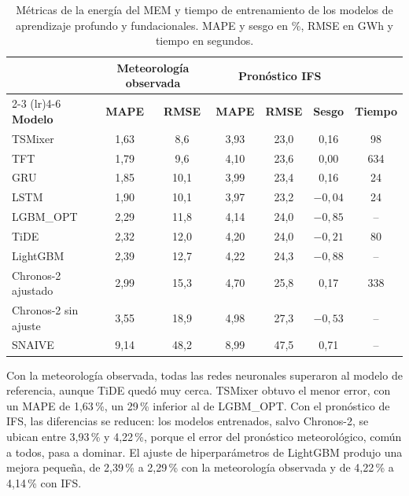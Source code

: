 \begin{table}[H]
	\centering
	\caption{Métricas de la energía del MEM y tiempo de entrenamiento de los modelos de aprendizaje profundo y fundacionales. MAPE y sesgo en \%, RMSE en GWh y tiempo en segundos.}
	\label{tab:resultados_profundos}
	\small
	\setlength{\tabcolsep}{4pt}
	\renewcommand{\arraystretch}{1.15}
	\begin{tabular*}{\textwidth}{@{\extracolsep{\fill}}lcccccc@{}}
		\toprule
		& \multicolumn{2}{c}{\textbf{Meteorología observada}} & \multicolumn{3}{c}{\textbf{Pronóstico IFS}} & \\
		\cmidrule(lr){2-3} \cmidrule(lr){4-6}
		\textbf{Modelo} & \textbf{MAPE} & \textbf{RMSE} & \textbf{MAPE} & \textbf{RMSE} & \textbf{Sesgo} & \textbf{Tiempo} \\
		\midrule
		TSMixer & 1,63 & 8,6 & 3,93 & 23,0 & 0,16 & 98 \\ \addlinespace[2pt]
		TFT & 1,79 & 9,6 & 4,10 & 23,6 & 0,00 & 634 \\ \addlinespace[2pt]
		GRU & 1,85 & 10,1 & 3,99 & 23,4 & 0,16 & 24 \\ \addlinespace[2pt]
		LSTM & 1,90 & 10,1 & 3,97 & 23,2 & $-0{,}04$ & 24 \\ \addlinespace[2pt]
		LGBM\_OPT & 2,29 & 11,8 & 4,14 & 24,0 & $-0{,}85$ & -- \\ \addlinespace[2pt]
		TiDE & 2,32 & 12,0 & 4,20 & 24,0 & $-0{,}21$ & 80 \\ \addlinespace[2pt]
		LightGBM & 2,39 & 12,7 & 4,22 & 24,3 & $-0{,}88$ & -- \\ \addlinespace[2pt]
		Chronos-2 ajustado & 2,99 & 15,3 & 4,70 & 25,8 & 0,17 & 338 \\ \addlinespace[2pt]
		Chronos-2 sin ajuste & 3,55 & 18,9 & 4,98 & 27,3 & $-0{,}53$ & -- \\ \addlinespace[2pt]
		SNAIVE & 9,14 & 48,2 & 8,99 & 47,5 & 0,71 & -- \\
		\bottomrule
	\end{tabular*}
\end{table}

Con la meteorología observada, todas las redes neuronales superaron al modelo de referencia, aunque TiDE quedó muy cerca. TSMixer obtuvo el menor error, con un MAPE de 1,63\,\%, un 29\,\% inferior al de LGBM\_OPT. Con el pronóstico de IFS, las diferencias se reducen: los modelos entrenados, salvo Chronos-2, se ubican entre 3,93\,\% y 4,22\,\%, porque el error del pronóstico meteorológico, común a todos, pasa a dominar. El ajuste de hiperparámetros de LightGBM produjo una mejora pequeña, de 2,39\,\% a 2,29\,\% con la meteorología observada y de 4,22\,\% a 4,14\,\% con IFS.

